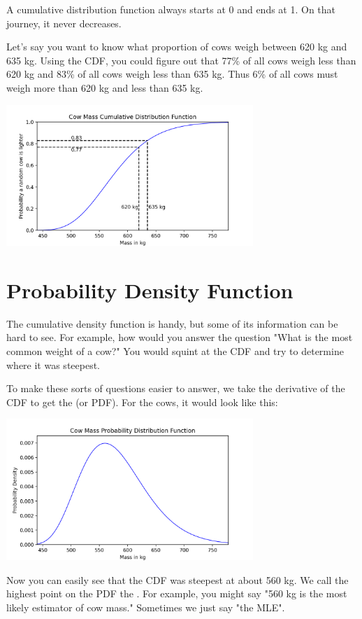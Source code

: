 A cumulative distribution function always starts at 0 and ends at 1.  On that journey, it never decreases.

Let's say you want to know what proportion of cows weigh between 620 kg and 635 kg.  Using the CDF, you could figure out that 77\% of all cows weigh less than 620 kg and 83\% of all cows 
weigh less than 635 kg.  Thus 6\% of all cows must weigh more than 620 kg and less than 635 kg.

\includegraphics[width=0.7\textwidth]{cow_cdf_bounds.png}

\section{Probability Density Function}

The cumulative density function is handy,  but some of its information can be hard to see.  For example,  how would you answer the question "What is the most common weight of a cow?"  You would
squint at the CDF and try to determine where it was steepest.

To make these sorts of questions easier to answer,  we take the derivative of the CDF to get the  (or PDF).  For the cows,  it would look like this:

\includegraphics[width=0.7\textwidth]{cow_pdf.png}

Now you can easily see that the CDF was steepest at about 560 kg.  We call the highest point on the PDF the .  For example, you might say "560 kg is the most likely estimator of cow mass."  Sometimes we just say "the MLE".

